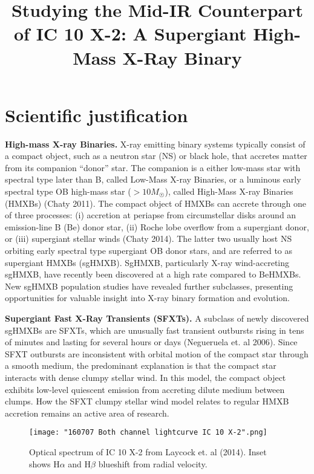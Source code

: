 \documentclass{article}
\title{Studying the Mid-IR Counterpart of IC 10 X-2: A Supergiant High-Mass X-Ray Binary}
\author{}
\date{}
\begin{document}
\pagestyle{fancy}
\chead{}
\rhead{\thepage}
\maketitle  \vspace{-21ex}
\thispagestyle{fancy}
\section{Scientific justification}

\vspace{-1ex}
\textbf{High-mass X-ray Binaries.}
X-ray emitting binary systems typically consist of a compact object, such as a neutron star (NS) or black hole, that accretes matter from its companion ``donor'' star. The companion is a either low-mass star with spectral type later than B, called Low-Mass X-ray Binaries, or a luminous early spectral type OB high-mass star ($> 10 M_{\astrosun}$), called High-Mass X-ray Binaries (HMXBs) (Chaty 2011). The compact object of HMXBs can accrete through one of three processes: (i) accretion at periapse from circumstellar disks around an emission-line B (Be) donor star, (ii) Roche lobe overflow from a supergiant donor, or (iii) supergiant stellar winds (Chaty 2014). The latter two usually host NS orbiting early spectral type supergiant OB donor stars, and are referred to as supergiant HMXBs (sgHMXB). SgHMXB, particularly X-ray wind-accreting sgHMXB, have recently been discovered at a high rate compared to BeHMXBs. New sgHMXB population studies have revealed further subclasses, presenting opportunities for valuable insight into X-ray binary formation and evolution.

\noindent\textbf{Supergiant Fast X-Ray Transients (SFXTs).} A subclass of newly discovered sgHMXBs are SFXTs, which are unusually fast transient outbursts rising in tens of minutes and lasting for several hours or days (Negueruela et. al 2006). Since SFXT outbursts are inconsistent with orbital motion of the compact star through a smooth medium, the predominant explanation is that the compact star interacts with dense clumpy stellar wind. In this model, the compact object exhibits low-level quiescent emission from accreting dilute medium between clumps. How the SFXT clumpy stellar wind model relates to regular HMXB accretion remains an active area of research.

\begin{wrapfigure}{l}{0.4\textwidth}
	\vspace{-2ex}
	\texttt{[image: "160707 Both channel lightcurve IC 10 X-2".png]}
	\caption{Optical spectrum of IC 10 X-2 from Laycock et. al (2014). Inset shows H$\alpha$ and H$\beta$ blueshift from radial velocity.}
	\label{fig:Laycock IC 10 X-2 optical spectrum}
\end{wrapfigure}
\end{document}
